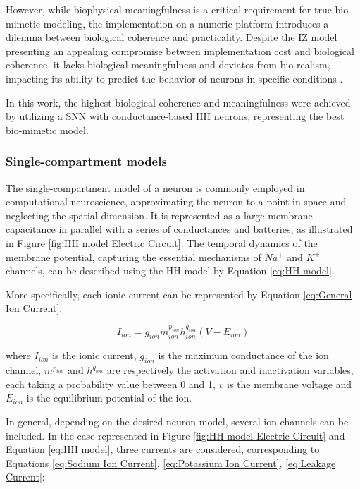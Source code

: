 However, while biophysical meaningfulness is a critical requirement for true bio-mimetic modeling, the implementation on a numeric platform introduces a dilemma between biological coherence and practicality. Despite the IZ model presenting an appealing compromise between implementation cost and biological coherence, it lacks biological meaningfulness and deviates from bio-realism, impacting its ability to predict the behavior of neurons in specific conditions \cite{Brette2015}.

In this work, the highest biological coherence and meaningfulness were achieved by utilizing a SNN with conductance-based HH neurons, representing the best bio-mimetic model.

\subsubsection{Single-compartment models}

The single-compartment model of a neuron is commonly employed in computational neuroscience, approximating the neuron to a point in space and neglecting the spatial dimension. It is represented as a large membrane capacitance in parallel with a series of conductances and batteries, as illustrated in Figure \ref{fig:HH model Electric Circuit}. The temporal dynamics of the membrane potential, capturing the essential mechanisms of $Na^{+}$ and $K^{+}$ channels, can be described using the HH model by Equation \ref{eq:HH model}.

More specifically, each ionic current can be represented by Equation \ref{eq:General Ion Current}:

\begin{equation}
I_{ion} = g_{ion} m^{{p}_{ion}}_{ion} h^{{q}_{ion}}_{ion} (V-E_{ion})
\label{eq:General Ion Current}
\end{equation}

where $I_{ion}$ is the ionic current, $g_{ion}$ is the maximum conductance of the ion channel, $m^{{p}_{ion}}$ and $h^{{q}_{ion}}$ are respectively the activation and inactivation variables, each taking a probability value between 0 and 1, $v$ is the membrane voltage and $E_{ion}$ is the equilibrium potential of the ion. 

In general, depending on the desired neuron model, several ion channels can be included. In the case represented in Figure \ref{fig:HH model Electric Circuit} and Equation \ref{eq:HH model}, three currents are considered, corresponding to Equations \ref{eq:Sodium Ion Current}, \ref{eq:Potassium Ion Current}, \ref{eq:Leakage Current}:

